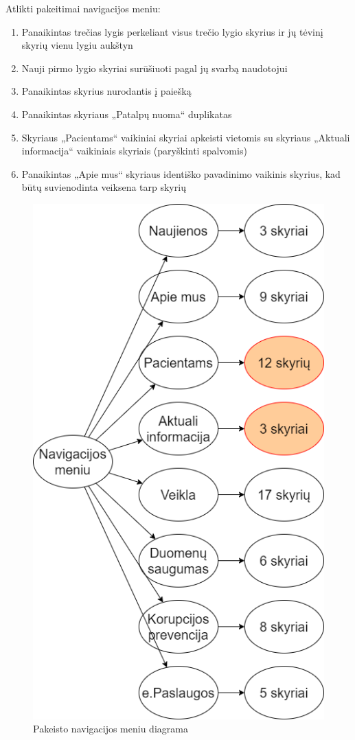 \documentclass{VUMIFPSbakalaurinis}
\begin{document}
Atlikti pakeitimai navigacijos meniu:
\begin{enumerate}
	\item Panaikintas trečias lygis perkeliant visus trečio lygio skyrius ir jų tėvinį skyrių vienu lygiu aukštyn
	\item Nauji pirmo lygio skyriai surūšiuoti pagal jų svarbą naudotojui
	\item Panaikintas skyrius nurodantis į paiešką
	\item Panaikintas skyriaus „Patalpų nuoma“ duplikatas
	\item Skyriaus „Pacientams“ vaikiniai skyriai apkeisti vietomis su skyriaus „Aktuali informacija“ vaikiniais skyriais (paryškinti spalvomis)
	\item Panaikintas „Apie mus“ skyriaus identiško pavadinimo vaikinis skyrius, kad būtų suvienodinta veiksena tarp skyrių
\end{enumerate}

\begin{figure}[htb]
    \centering
    \includegraphics[scale=0.65]{img/NavigacijosMeniuPakeistas}
    \caption{Pakeisto navigacijos meniu diagrama}
    \label{img:NavigacijosMeniuPakeistas}
\end{figure}
\end{document}
